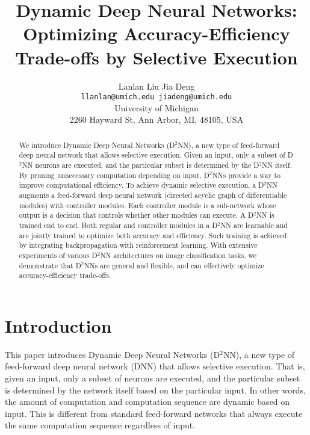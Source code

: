 \documentclass[10pt,twocolumn,letterpaper]{article}
\begin{document}
\title{Dynamic Deep Neural Networks: \\ Optimizing Accuracy-Efficiency Trade-offs by Selective Execution}

\author{
Lanlan Liu \qquad Jia Deng\\
{\tt\small llanlan@umich.edu \qquad jiadeng@umich.edu} \\
University of Michigan\\
2260 Hayward St, Ann Arbor, MI, 48105, USA 
}
\maketitle

\begin{abstract}
We introduce Dynamic Deep Neural Networks (D$^2$NN), a new type of feed-forward deep neural 
network that allows selective execution. Given an input, only a subset of D$^2$NN neurons
are executed, and the particular subset is determined by the D$^2$NN itself.
By pruning unnecessary computation depending on input, D$^2$NNs
provide a way to improve computational efficiency. To achieve dynamic selective execution,
a D$^2$NN augments a feed-forward deep neural network (directed acyclic graph of
differentiable modules) with controller modules. Each controller module is
a sub-network whose output is a decision that controls whether other modules can execute.
A D$^2$NN is trained end to end. Both regular and controller modules in a D$^2$NN are
learnable and are jointly trained to optimize both accuracy and efficiency. Such training
is achieved by integrating backpropagation with reinforcement learning. With extensive
experiments of various D$^2$NN architectures on image classification tasks, we demonstrate that D$^2$NNs are general and flexible, and
can effectively optimize accuracy-efficiency trade-offs. 
\end{abstract}

\section{Introduction}

This paper introduces Dynamic Deep Neural Networks (D$^2$NN), a new type of feed-forward
deep neural network (DNN) that allows selective execution. That is, given an input, only a
subset of neurons are executed, and the particular subset is determined by the network
itself based on the particular input. In other words, the amount of computation
and computation sequence are dynamic based on input. This is different from
standard feed-forward networks that always execute the same computation sequence
regardless of input. 
\end{document}

